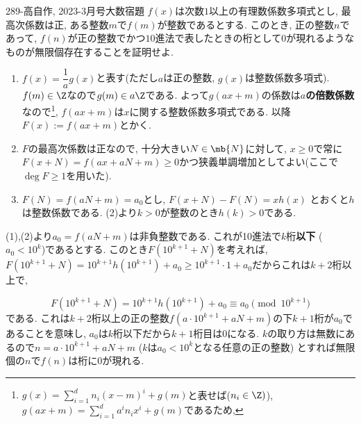 \begin{prob}{289}{-高}{自作, 2023-3月号大数宿題}
$f(x)$は次数$1$以上の有理数係数多項式とし, 最高次係数は正, ある整数$m$で$f(m)$が整数であるとする.
このとき, 正の整数$n$であって, $f(n)$が正の整数でかつ$10$進法で表したときの桁として$0$が現れるようなものが無限個存在することを証明せよ.
\end{prob}

 \begin{enumerate}
        \item $f(x) = \dfrac{1}{a} g(x)$と表す(ただし$a$は正の整数, $g(x)$は整数係数多項式). $f(m)\in \Z$なので$g(m) \in a\Z$である. よって$g(ax + m)$の係数は\textbf{$a$の倍数係数}なので\footnote{$g(x) = \sum_{i=1}^{d} n_i (x-m)^{i} + g(m)$と表せば($n_i\in \Z )$), $g(ax + m) = \sum_{i=1}^{d}a^i n_i x^i+ g(m)$であるため, }, $f(ax + m)$は$x$に関する整数係数多項式である. 以降$F(x):= f(ax+m)$とかく.
        \item $F$の最高次係数は正なので, 十分大きい$N\in\mb{N}$に対して, $x\geq 0$で常に$F(x+N) = f(ax + aN + m) \geq 0$かつ狭義単調増加としてよい(ここで$\deg{F} \geq 1$を用いた).
        \item $F(N) = f(aN + m) = a_0$とし, $F(x+N) - F(N) = xh(x)$ とおくと$h$は整数係数である. (2)より$k>0$が整数のとき$h(k) > 0$である.

    \end{enumerate}
      (1),(2)より$a_0 = f(aN + m)$は非負整数である. これが10進法で$k$桁\textbf{以下} ($a_0 < 10^{k}$)であるとする. このとき$F(10^{k+1} + N)$を考えれば, $F(10^{k+1} + N) = 10^{k+1}h(10^{k+1}) + a_0 \geq 10^{k+1}\cdot 1 + a_0$だからこれは$k+2$桁以上で,

 \[
 F(10^{k+1} + N) =  10^{k+1} h(10^{k+1}) + a_0 \equiv a_0 \pmod{10^{k+1}}
 \]
 である. これは$k+2$桁以上の正の整数$f(a\cdot 10^{k+1} + aN + m)$の下$k+1$桁が$a_0$であることを意味し, $a_0$は$k$桁以下だから$k+1$桁目は0になる. $k$の取り方は無数にあるので$n = a\cdot 10^{k+1} + aN + m$ ($k$は$a_0 < 10^k$となる任意の正の整数) とすれば無限個の$n$で$f(n)$は桁に0が現れる.
